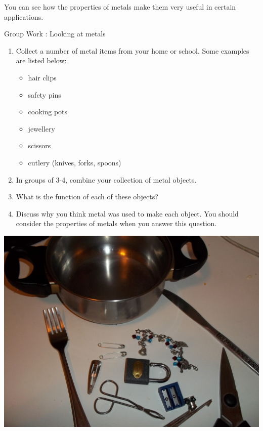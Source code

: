          \label{m38708*id65852}You can see how the properties of metals make them very useful in certain applications.\par 
\label{m38708*secfhsst!!!underscore!!!id320} 
            \begin{activity}{Group Work : Looking at metals}{
            \nopagebreak
\begin{minipage}{0.5\textwidth}
        \label{m38708*id65869}\begin{enumerate}[noitemsep, label=\textbf{\arabic*}. ] 
            \label{m38708*uid83}\item Collect a number of metal items from your home or school. Some examples are listed below:
\label{m38708*id65885}\begin{itemize}[noitemsep]
            \label{m38708*uid84}\item hair clips
\label{m38708*uid85}\item safety pins
\label{m38708*uid86}\item cooking pots
\label{m38708*uid87}\item jewellery
\label{m38708*uid88}\item scissors
\label{m38708*uid89}\item cutlery (knives, forks, spoons)
\end{itemize}
        \label{m38708*uid90}\item In groups of 3-4, combine your collection of metal objects.
\label{m38708*uid91}\item What is the function of each of these objects?
\label{m38708*uid92}\item Discuss why you think metal was used to make each object. You should consider the properties of metals when you answer this question.
\end{enumerate}
\end{minipage}
\begin{minipage}{.5\textwidth}
\begin{center}
 \includegraphics[width=.8\textwidth]{photos/metal_objects.jpg}\par
\end{center}
\end{minipage}
}
\end{activity}
      \label{m38708*uid93}
